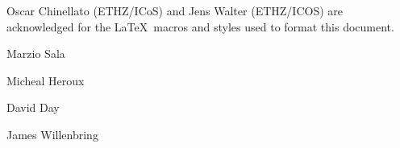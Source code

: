 \documentclass[final]{colabarticle}
\begin{document}
  \smallskip

  Oscar Chinellato (ETHZ/ICoS) and Jens Walter (ETHZ/ICOS) are acknowledged
  for the \LaTeX\ macros and styles used to format this document.

  \vspace*{1cm}

  \hfill Marzio Sala

  \hfill Micheal Heroux

  \hfill David Day

  \hfill James Willenbring

\clearpage

\tableofcontents

\clearpage



\clearpage
\newpage


\clearpage
\newpage


\clearpage
\newpage


\clearpage
\newpage


\clearpage
\newpage


\clearpage
\newpage


\clearpage
\newpage


\clearpage
\newpage


\clearpage
\newpage


\clearpage
\newpage


\clearpage
\newpage


\clearpage
\newpage


\clearpage
\newpage


\clearpage
\newpage


\clearpage
\newpage




\end{document}
